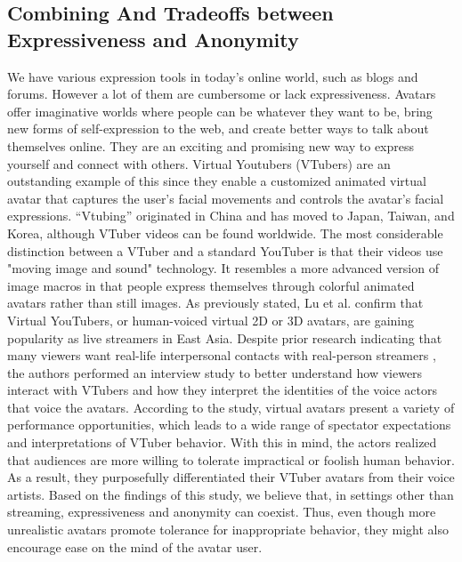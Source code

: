 \subsection{Combining And Tradeoffs between Expressiveness and Anonymity}
We have various expression tools in today's online world, such as blogs and forums. However a lot of them are cumbersome or lack expressiveness. Avatars offer imaginative worlds where people can be whatever they want to be, bring new forms of self-expression to the web, and create better ways to talk about themselves online. They are an exciting and promising new way to express yourself and connect with others. Virtual Youtubers (VTubers) are an outstanding example of this since they enable a customized animated virtual avatar that captures the user's facial movements and controls the avatar's facial expressions. “Vtubing” originated in China and has moved to Japan, Taiwan, and Korea, although VTuber videos can be found worldwide. The most considerable distinction between a VTuber and a standard YouTuber is that their videos use "moving image and sound" technology. It resembles a more advanced version of image macros in that people express themselves through colorful animated avatars rather than still images. As previously stated, Lu et al. \cite{LU21} confirm that Virtual YouTubers, or human-voiced virtual 2D or 3D avatars, are gaining popularity as live streamers in East Asia. Despite prior research indicating that many viewers want real-life interpersonal contacts with real-person streamers \cite{LU21, TUR22}, the authors performed an interview study to better understand how viewers interact with VTubers and how they interpret the identities of the voice actors that voice the avatars. According to the study, virtual avatars present a variety of performance opportunities, which leads to a wide range of spectator expectations and interpretations of VTuber behavior. With this in mind, the actors realized that audiences are more willing to tolerate impractical or foolish human behavior. As a result, they purposefully differentiated their VTuber avatars from their voice artists. Based on the findings of this study, we believe that, in settings other than streaming, expressiveness and anonymity can coexist. Thus, even though more unrealistic avatars promote tolerance for inappropriate behavior, they might also encourage ease on the mind of the avatar user.

